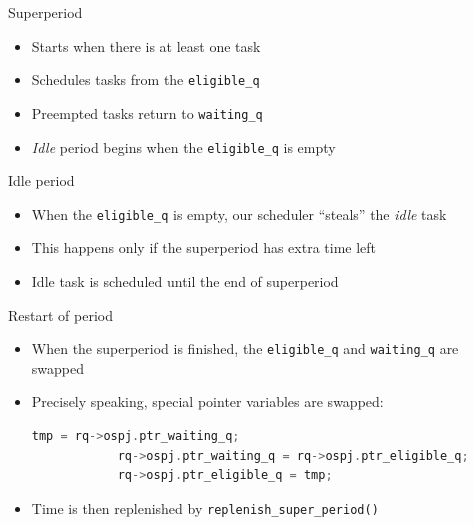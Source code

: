 \begin{frame}{Superperiod}
    \begin{itemize}
        \item Starts when there is at least one task \pause
        \item Schedules tasks from the \texttt{eligible\_q}
        \item Preempted tasks return to \texttt{waiting\_q}\pause
        \item \textit{Idle} period begins when the \texttt{eligible\_q} is empty
    \end{itemize}
\end{frame}


\begin{frame}{Idle period}
    \begin{itemize}
        \item When the \texttt{eligible\_q} is empty, our scheduler ``steals'' the \textit{idle} task
        \item This happens only if the superperiod has extra time left\pause
        \item Idle task is scheduled until the end of superperiod
    \end{itemize}
\end{frame}


\begin{frame}[fragile]{Restart of period}
    \begin{itemize}
        \item When the superperiod is finished, the \texttt{eligible\_q} and \texttt{waiting\_q} are swapped
        \item Precisely speaking, special pointer variables are swapped:
            \begin{lstlisting}[language=C,gobble=12]
            tmp = rq->ospj.ptr_waiting_q;
            rq->ospj.ptr_waiting_q = rq->ospj.ptr_eligible_q;
            rq->ospj.ptr_eligible_q = tmp;
            \end{lstlisting} 
        \item Time is then replenished by \texttt{replenish\_super\_period()}
    \end{itemize}
\end{frame}

